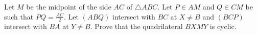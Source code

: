 Let $M$ be the midpoint of the side $AC$ of $\triangle{ABC}$. Let $P\in AM$ and $Q\in CM$ be such that $PQ=\frac{AC}{2}$. Let $(ABQ)$ intersect with $BC$ at $X\neq B$ and $(BCP)$ intersect with $BA$ at $Y\neq B$. Prove that the quadrilateral $BXMY$ is cyclic.
